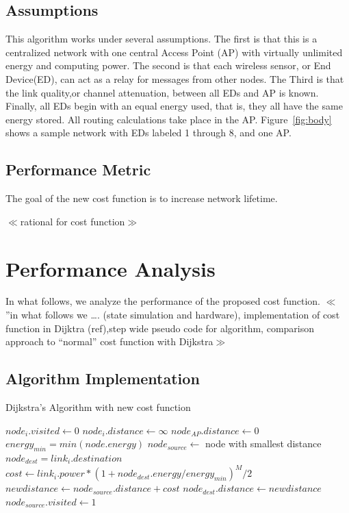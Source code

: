 \documentclass{article}
\begin{document}
\subsection{Assumptions}
This algorithm works under several assumptions. The first is that this is a centralized network with one central Access Point (AP) with virtually unlimited energy and  computing power. The second is that each wireless sensor, or End Device(ED), can act as a relay for messages from other nodes. The Third is that the link quality,or channel attenuation, between all EDs and AP is known. Finally, all EDs begin with an equal energy used, that is, they all have the same energy stored. All routing calculations take place in the AP. Figure~\ref{fig:body} shows a sample network with EDs labeled 1 through 8, and one AP.

\subsection{Performance Metric}
The goal of the new cost function is to increase network lifetime. 

$\ll$rational for cost function$\gg$


\section{Performance Analysis}
In what follows, we analyze the performance of the proposed cost function. 
$\ll$”in what follows we …. (state simulation and hardware), implementation of cost function in Dijktra (ref),step wide pseudo code for algorithm, comparison approach to “normal” cost function with Dijkstra$\gg$

\subsection{Algorithm Implementation}
\begin{algorithm}
\caption{Dijkstra's Algorithm with new cost function}
\label{alg:dijkstra}
\begin{algorithmic}
	\STATE $node_i.visited \leftarrow 0$
	\STATE $node_i.distance \leftarrow \infty$
\ENDFOR
\STATE $node_{AP}.distance \leftarrow 0$
\STATE $energy_{min} = min(node.energy)$
	\STATE $node_{source} \leftarrow $ node with smallest distance
			\STATE $node_{dest} = link_i.destination$
				\STATE $cost \leftarrow link_i.power * (1 + node_{dest}.energy/energy_{min} )^M/2$
				\STATE $newdistance \leftarrow node_{source}.distance + cost$
				\STATE$node_{dest}.distance \leftarrow newdistance$
				\ENDIF
			\ENDIF
		\ENDIF
	\ENDFOR
	\STATE $node_{source}.visited \leftarrow 1$
\ENDWHILE
\end{algorithmic}
\end{algorithm}
\end{document}
